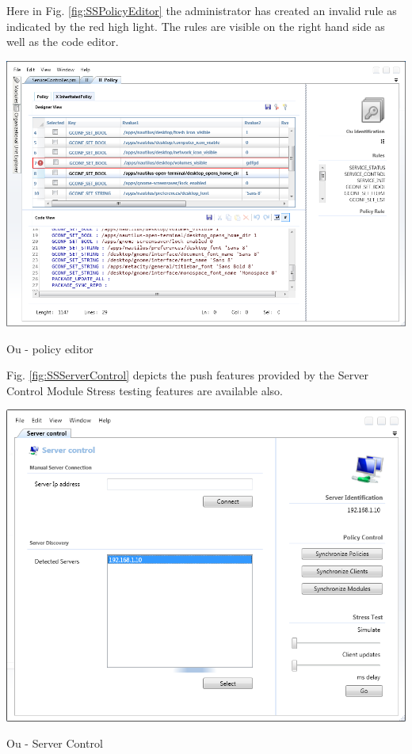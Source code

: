 	\normalsize
	{
		Here in Fig. \ref{fig:SSPolicyEditor} the administrator has created an invalid rule
		as indicated by the red high light. The rules are visible on the right hand side as well
		as the code editor.
		\newline			
	}

	\begin{figurehere}
		\centering
		\includegraphics[scale=0.5]{pages/appendix3/figures/lgpscreens/policy-editor.png}
		\caption{Ou - policy editor}
		\label{fig:SSPolicyEditor}
	\end{figurehere}

	
	\normalsize
	{
		Fig. \ref{fig:SSServerControl} depicts the push features provided by the Server Control Module
		Stress testing features are available also.
		\newline			
	}

	\begin{figurehere}
		\centering
		\includegraphics[scale=0.65]{pages/appendix3/figures/lgpscreens/servercontrol.png}
		\caption{Ou - Server Control}
		\label{fig:SSServerControl}
	\end{figurehere}
	
